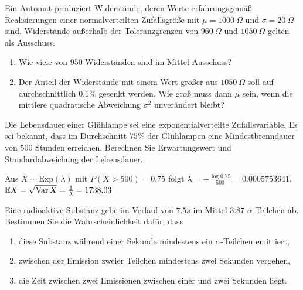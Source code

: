 Ein Automat produziert Widerstände, deren Werte
erfahrungsgemäß Realisierungen einer normalverteilten Zufallsgröße mit $\mu =
1000\ \Omega$ und $\sigma = 20\ \Omega$ sind. Widerstände außerhalb der
Toleranzgrenzen von $960\ \Omega$ und $1050\ \Omega$ gelten als Ausschuss.
\begin{enumerate}
    \item Wie viele von $950$ Widerständen sind im Mittel Ausschuss?
    \item Der Anteil der Widerstände mit einem Wert größer aus $1050\ \Omega$
        soll auf durchschnittlich $0.1\%$ gesenkt werden. Wie groß muss dann
        $\mu$ sein, wenn die mittlere quadratische Abweichung $\sigma^2$
        unverändert bleibt?
\end{enumerate}

 Die Lebensdauer einer Glühlampe sei
eine exponentialverteilte Zufallsvariable.  Es sei bekannt, dass im Durchschnitt
$75\%$ der Glühlampen eine Mindestbrenndauer von $500$ Stunden erreichen.
Berechnen Sie Erwartungswert und Standardabweichung der Lebensdauer. 

\solution Aus $X \sim \text{Exp}(\lambda)$ mit $P(X>500) = 0.75$
folgt $\lambda = - \frac{\log 0.75}{ 500} = 0.0005753641$.  $\mathbb E X = \sqrt{
\operatorname{Var} X } = \frac{1}{\lambda} = 1738.03$


 Eine radioaktive Substanz gebe im Verlauf
von $7.5 s$ im Mittel $3.87$ $\alpha$-Teilchen ab. Bestimmen Sie die
Wahrscheinlichkeit dafür, dass
\begin{enumerate}
    \item diese Substanz während einer Sekunde mindestens ein
        $\alpha$-Teilchen emittiert,
    \item zwischen der Emission zweier Teilchen mindestens zwei
        Sekunden vergehen,
    \item die Zeit zwischen zwei Emissionen zwischen einer und
        zwei Sekunden liegt.
\end{enumerate}

